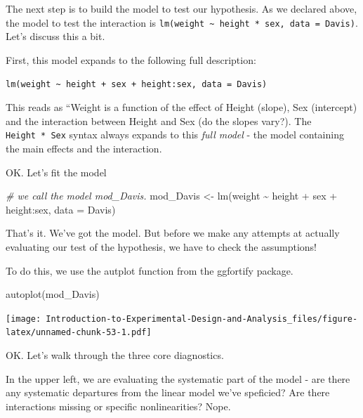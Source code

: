 \documentclass[
]{book}
\newenvironment{Shaded}{\begin{snugshade}}{\end{snugshade}}
\newcommand{\AttributeTok}[1]{\textcolor[rgb]{0.77,0.63,0.00}{#1}}
\newcommand{\CommentTok}[1]{\textcolor[rgb]{0.56,0.35,0.01}{\textit{#1}}}
\newcommand{\FunctionTok}[1]{\textcolor[rgb]{0.00,0.00,0.00}{#1}}
\newcommand{\NormalTok}[1]{#1}
\newcommand{\OtherTok}[1]{\textcolor[rgb]{0.56,0.35,0.01}{#1}}
\newcommand{\SpecialCharTok}[1]{\textcolor[rgb]{0.00,0.00,0.00}{#1}}
\begin{document}
The next step is to build the model to test our hypothesis. As we declared above, the model to test the interaction is \texttt{lm(weight\ \textasciitilde{}\ height\ *\ sex,\ data\ =\ Davis)}. Let's discuss this a bit.

First, this model expands to the following full description:

\texttt{lm(weight\ \textasciitilde{}\ height\ +\ sex\ +\ height:sex,\ data\ =\ Davis)}

This reads as ``Weight is a function of the effect of Height (slope), Sex (intercept) and the interaction between Height and Sex (do the slopes vary?). The \texttt{Height\ *\ Sex} syntax always expands to this \emph{full model} - the model containing the main effects and the interaction.

OK. Let's fit the model

\begin{Shaded}
\begin{Highlighting}[]
\CommentTok{\# we call the model mod\_Davis.}
\NormalTok{mod\_Davis }\OtherTok{\textless{}{-}} \FunctionTok{lm}\NormalTok{(weight }\SpecialCharTok{\textasciitilde{}}\NormalTok{ height }\SpecialCharTok{+}\NormalTok{ sex }\SpecialCharTok{+}\NormalTok{ height}\SpecialCharTok{:}\NormalTok{sex, }\AttributeTok{data =}\NormalTok{ Davis)}
\end{Highlighting}
\end{Shaded}

That's it. We've got the model. But before we make any attempts at actually evaluating our test of the hypothesis, we have to check the assumptions!

To do this, we use the autplot function from the ggfortify package.

\begin{Shaded}
\begin{Highlighting}[]
\FunctionTok{autoplot}\NormalTok{(mod\_Davis)}
\end{Highlighting}
\end{Shaded}

\texttt{[image: Introduction-to-Experimental-Design-and-Analysis\_files/figure-latex/unnamed-chunk-53-1.pdf]}

OK. Let's walk through the three core diagnostics.

In the upper left, we are evaluating the systematic part of the model - are there any systematic departures from the linear model we've speficied? Are there interactions missing or specific nonlinearities? Nope.
\end{document}
